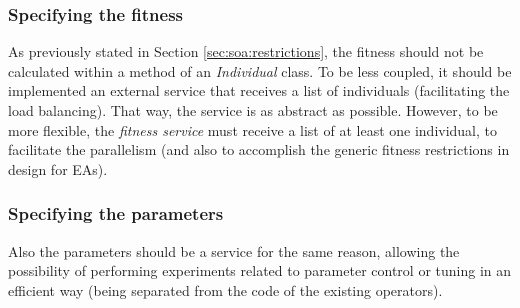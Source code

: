 

\subsubsection{Specifying the fitness}




As previously stated in Section \ref{sec:soa:restrictions}, %
 the 
fitness should not be calculated within a method of an {\em Individual} class. To be less
coupled, it should be implemented an external service that receives a list of individuals (facilitating the load balancing). That way, the service is as abstract as possible. However, to be more flexible, the
  {\em fitness service} must receive a list of at least one
  individual, to facilitate the parallelism (and also to accomplish the generic fitness restrictions in design for EAs). %

\subsubsection{Specifying the parameters}
Also the parameters should be
a service for the same reason, allowing the possibility of performing
experiments related to  parameter control or tuning \cite{ParameterControlEiben07} in an efficient way
(being separated from the code of the existing operators). 

